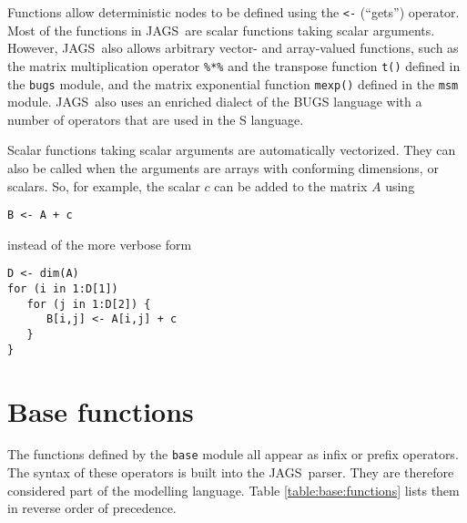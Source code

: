\documentclass[11pt, a4paper, titlepage]{report}
\newcommand{\JAGS}{\textsf{JAGS}}
\begin{document}
Functions allow deterministic nodes to be defined using the \verb+<-+
(``gets'') operator.  Most of the functions in \JAGS\ are scalar
functions taking scalar arguments. However, \JAGS\ also allows
arbitrary vector- and array-valued functions, such as the matrix
multiplication operator \verb+%*%+ and the transpose function
\verb+t()+ defined in the \verb+bugs+ module, and the matrix
exponential function \verb+mexp()+ defined in the \verb+msm+
module. \JAGS\ also uses an enriched dialect of the BUGS language with
a number of operators that are used in the S language.

Scalar functions taking scalar arguments are automatically vectorized.
They can also be called when the arguments are arrays with conforming
dimensions, or scalars. So, for example, the scalar $c$ can be added to
the matrix $A$ using
\begin{verbatim}
B <- A + c
\end{verbatim}
instead of the more verbose form
\begin{verbatim}
D <- dim(A)
for (i in 1:D[1])
   for (j in 1:D[2]) {
      B[i,j] <- A[i,j] + c
   }
}
\end{verbatim}

\section{Base functions}

The functions defined by the \verb+base+ module all appear as infix or
prefix operators. The syntax of these operators is built into the
\JAGS\ parser. They are therefore considered part of the modelling
language.  Table \ref{table:base:functions} lists them in reverse
order of precedence.
\end{document}
